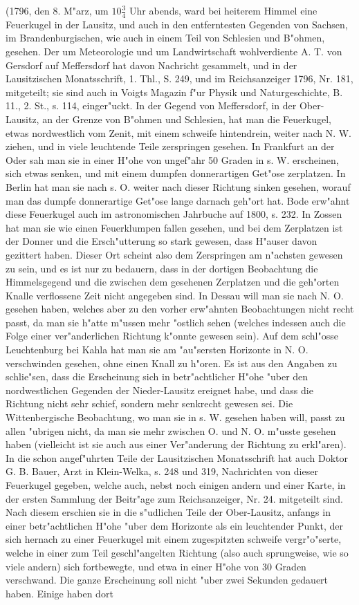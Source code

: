 \documentclass[a4paper, 11pt, oneside, polutonikogreek, german]{article}
\begin{document}
(1796, den 8. M"arz, um $\mathfrak{10\frac{3}{4}}$ Uhr abends, ward bei heiterem Himmel eine Feuerkugel in der Lausitz, und auch in den entferntesten Gegenden von Sachsen, im Brandenburgischen, wie auch in einem Teil von Schlesien und B"ohmen, gesehen. Der um Meteorologie und um Landwirtschaft wohlverdiente A. T. von Gersdorf auf Meffersdorf hat davon Nachricht gesammelt, und in der Lausitzischen Monatsschrift, 1. Thl., S. 249, und im Reichsanzeiger 1796, Nr. 181, mitgeteilt; sie sind auch in Voigts Magazin f"ur Physik und Naturgeschichte, B. 11., 2. St., s. 114, einger"uckt. In der Gegend von Meffersdorf, in der Ober-Lausitz, an der Grenze von B"ohmen und Schlesien, hat man die Feuerkugel, etwas nordwestlich vom Zenit, mit einem schweife hintendrein, weiter nach N. W. ziehen, und in viele leuchtende Teile zerspringen gesehen. In Frankfurt an der Oder sah man sie in einer H"ohe von ungef"ahr 50 Graden in s. W. erscheinen, sich etwas senken, und mit einem dumpfen donnerartigen Get"ose zerplatzen. In Berlin hat man sie nach s. O. weiter nach dieser Richtung sinken gesehen, worauf man das dumpfe donnerartige Get"ose lange darnach geh"ort hat. Bode erw"ahnt diese Feuerkugel auch im astronomischen Jahrbuche auf 1800, s. 232. In Zossen hat man sie wie einen Feuerklumpen fallen gesehen, und bei dem Zerplatzen ist der Donner und die Ersch"utterung so stark gewesen, dass H"auser davon gezittert haben. Dieser Ort scheint also dem Zerspringen am n"achsten gewesen zu sein, und es ist nur zu bedauern, dass in der dortigen Beobachtung die Himmelsgegend und die zwischen dem gesehenen Zerplatzen und die geh"orten Knalle verflossene Zeit nicht angegeben sind. In Dessau will man sie nach N. O. gesehen haben, welches aber zu den vorher erw"ahnten Beobachtungen nicht recht passt, da man sie h"atte m"ussen mehr "ostlich sehen (welches indessen auch die Folge einer ver"anderlichen Richtung k"onnte gewesen sein). Auf dem schl"osse Leuchtenburg bei Kahla hat man sie am "au"sersten Horizonte in N. O. verschwinden gesehen, ohne einen Knall zu h"oren. Es ist aus den Angaben zu schlie"sen, dass die Erscheinung sich in betr"achtlicher H"ohe "uber den nordwestlichen Gegenden der Nieder-Lausitz ereignet habe, und dass die Richtung nicht sehr schief, sondern mehr senkrecht gewesen sei. Die Wittenbergische Beobachtung, wo man sie in s. W. gesehen haben will, passt zu allen "ubrigen nicht, da man sie mehr zwischen O. und N. O. m"usste gesehen haben (vielleicht ist sie auch aus einer Ver"anderung der Richtung zu erkl"aren). In die schon angef"uhrten Teile der Lausitzischen Monatsschrift hat auch Doktor G. B. Bauer, Arzt in Klein-Welka, s. 248 und 319, Nachrichten von dieser Feuerkugel gegeben, welche auch, nebst noch einigen andern und einer Karte, in der ersten Sammlung der Beitr"age zum Reichsanzeiger, Nr. 24. mitgeteilt sind. Nach diesem erschien sie in die s"udlichen Teile der Ober-Lausitz, anfangs in einer betr"achtlichen H"ohe "uber dem Horizonte als ein leuchtender Punkt, der sich hernach zu einer Feuerkugel mit einem zugespitzten schweife vergr"o"serte, welche in einer zum Teil geschl"angelten Richtung (also auch sprungweise, wie so viele andern) sich fortbewegte, und etwa in einer H"ohe von 30 Graden verschwand. Die ganze Erscheinung soll nicht "uber zwei Sekunden gedauert haben. Einige haben dort 
\end{document}
